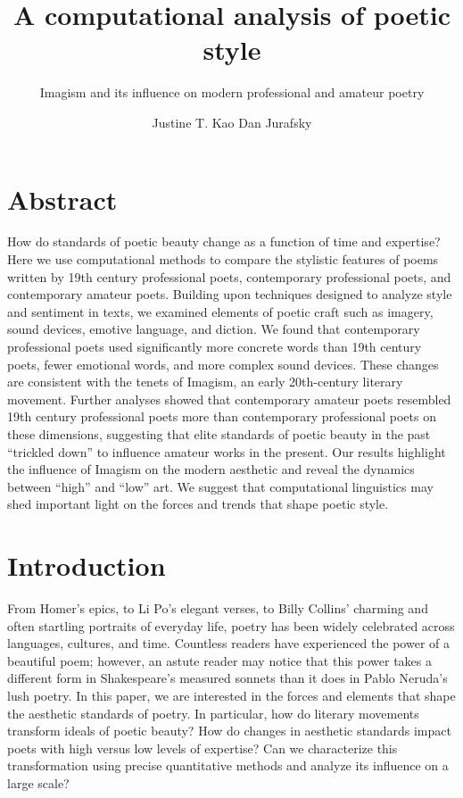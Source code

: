 \documentclass{book}
\title       {A computational analysis of poetic style}
\subtitle{Imagism and its influence on modern professional and amateur poetry}
\author      {Justine T. Kao\affiliation{Department of Psychology, Stanford University} {Dan Jurafsky\affiliation{Department of Linguistics, Stanford University}}}
\begin{document}
\section*{Abstract}
How do standards of poetic beauty change as a function of time and expertise? Here we use computational methods to compare the stylistic features of poems written by 19th century professional poets, contemporary professional poets, and contemporary amateur poets. Building upon techniques designed to analyze style and sentiment in texts, we examined elements of poetic craft such as imagery, sound devices, emotive language, and diction. We found that contemporary professional poets used significantly more concrete words than 19th century poets, fewer emotional words, and more complex sound devices. These changes are consistent with the tenets of Imagism, an early 20th-century literary movement. Further analyses showed that contemporary amateur poets resembled 19th century professional poets more than contemporary professional poets on these dimensions, suggesting that elite standards of poetic beauty in the past ``trickled down'' to influence amateur works in the present. Our results highlight the influence of Imagism on the modern aesthetic and reveal the dynamics between ``high'' and ``low'' art. We suggest that computational linguistics may shed important light on the forces and trends that shape poetic style.

\clearpage

\section{Introduction} 
From Homer's epics, to Li Po's elegant verses, to Billy Collins' charming and often startling portraits of everyday life, poetry has been widely celebrated across languages, cultures, and time. Countless readers have experienced the power of a beautiful poem; however, an astute reader may notice that this power takes a different form in Shakespeare's measured sonnets than it does in Pablo Neruda's lush poetry. In this paper, we are interested in the forces and elements that shape the aesthetic standards of poetry. In particular, how do literary movements transform ideals of poetic beauty? How do changes in aesthetic standards impact poets with high versus low levels of expertise? Can we characterize this transformation using precise quantitative methods and analyze its influence on a large scale? 
\end{document}
